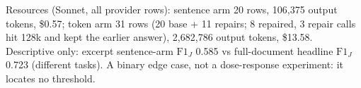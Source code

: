 \begin{table}[t]
\begin{flushleft}
Resources (Sonnet, all provider rows): sentence arm 20 rows, 106,375 output tokens, \$0.57; token arm 31 rows (20 base + 11 repairs; 8 repaired, 3 repair calls hit 128k and kept the earlier answer), 2,682,786 output tokens, \$13.58.\\
Descriptive only: excerpt sentence-arm $\mathrm{F1}_{J}$ 0.585 vs full-document headline $\mathrm{F1}_{J}$ 0.723 (different tasks). A binary edge case, not a dose-response experiment: it locates no threshold.\\
\end{flushleft}
\end{table}
